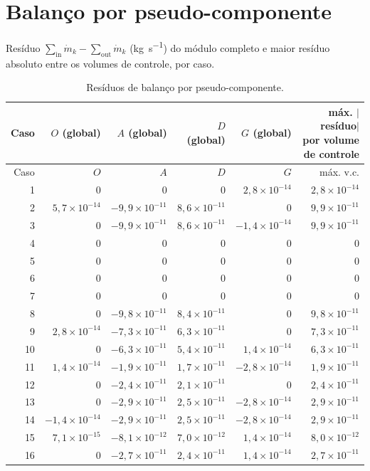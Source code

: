 \documentclass[11pt,a4paper]{article}
\numberwithin{equation}{section}
\numberwithin{table}{section}
\numberwithin{figure}{section}
\begin{document}
\section{Balanço por pseudo-componente}\label{app:comp}
Resíduo $\sum_{\mathrm{in}}\dot m_k-\sum_{\mathrm{out}}\dot m_k$ (\si{\kilogram\per\second}) do módulo completo e maior resíduo absoluto entre os volumes de controle, por caso.
\small\begin{longtable}{rrrrrr}
\caption{Resíduos de balanço por pseudo-componente.}\\\toprule
Caso & $O$ (global) & $A$ (global) & $D$ (global) & $G$ (global) & máx. $|$resíduo$|$ por volume de controle\\\midrule\endfirsthead
\toprule Caso & $O$ & $A$ & $D$ & $G$ & máx. v.c.\\\midrule\endhead

1 & $0$ & $0$ & $0$ & $2{,}8\times10^{-14}$ & $2{,}8\times10^{-14}$\\
2 & $5{,}7\times10^{-14}$ & $-9{,}9\times10^{-11}$ & $8{,}6\times10^{-11}$ & $0$ & $9{,}9\times10^{-11}$\\
3 & $0$ & $-9{,}9\times10^{-11}$ & $8{,}6\times10^{-11}$ & $-1{,}4\times10^{-14}$ & $9{,}9\times10^{-11}$\\
4 & $0$ & $0$ & $0$ & $0$ & $0$\\
5 & $0$ & $0$ & $0$ & $0$ & $0$\\
6 & $0$ & $0$ & $0$ & $0$ & $0$\\
7 & $0$ & $0$ & $0$ & $0$ & $0$\\
8 & $0$ & $-9{,}8\times10^{-11}$ & $8{,}4\times10^{-11}$ & $0$ & $9{,}8\times10^{-11}$\\
9 & $2{,}8\times10^{-14}$ & $-7{,}3\times10^{-11}$ & $6{,}3\times10^{-11}$ & $0$ & $7{,}3\times10^{-11}$\\
10 & $0$ & $-6{,}3\times10^{-11}$ & $5{,}4\times10^{-11}$ & $1{,}4\times10^{-14}$ & $6{,}3\times10^{-11}$\\
11 & $1{,}4\times10^{-14}$ & $-1{,}9\times10^{-11}$ & $1{,}7\times10^{-11}$ & $-2{,}8\times10^{-14}$ & $1{,}9\times10^{-11}$\\
12 & $0$ & $-2{,}4\times10^{-11}$ & $2{,}1\times10^{-11}$ & $0$ & $2{,}4\times10^{-11}$\\
13 & $0$ & $-2{,}9\times10^{-11}$ & $2{,}5\times10^{-11}$ & $-2{,}8\times10^{-14}$ & $2{,}9\times10^{-11}$\\
14 & $-1{,}4\times10^{-14}$ & $-2{,}9\times10^{-11}$ & $2{,}5\times10^{-11}$ & $-2{,}8\times10^{-14}$ & $2{,}9\times10^{-11}$\\
15 & $7{,}1\times10^{-15}$ & $-8{,}1\times10^{-12}$ & $7{,}0\times10^{-12}$ & $1{,}4\times10^{-14}$ & $8{,}0\times10^{-12}$\\
16 & $0$ & $-2{,}7\times10^{-11}$ & $2{,}4\times10^{-11}$ & $1{,}4\times10^{-14}$ & $2{,}7\times10^{-11}$\\
\bottomrule\end{longtable}\normalsize
\end{document}
